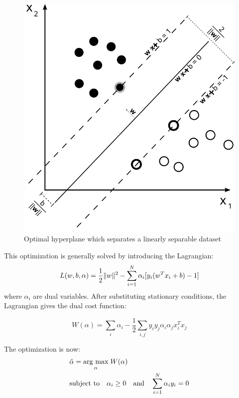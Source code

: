   \begin{figure}[!ht]
  \centering
    \includegraphics[scale=0.3]{./svm.png}
  \caption{Optimal hyperplane which separates a linearly separable dataset}
  \end{figure}

  \noindent This optimization is generally solved by introducing the Lagrangian:
  \begin{equation}
  L(w,b,\alpha) = \frac{1}{2} \lVert w \rVert^2 - \sum_{i = 1}^{N} \alpha_i [ y_i ( w^T x_i + b) - 1 ]
  \end{equation} 
  where $\alpha_i$ are dual variables. After substituting stationary conditions, the Lagrangian gives the dual cost function:
  
  \begin{equation}
  W(\alpha) = \sum_i \alpha_i - \frac{1}{2} \sum_{i,j} y_i y_j \alpha_i \alpha_j x_i^{T} x_j
  \end{equation}

  \noindent The optimization is now:
  \begin{eqnarray}
  & \hat{\alpha} = \underset{\alpha}{\operatorname{arg}\,\operatorname{max}}\; W(\alpha) \nonumber\\
  & \text{subject to} \quad \alpha_i \ge 0  \quad \text{and} \quad \sum_{i=1}^{N} \alpha_i y_i = 0
  \end{eqnarray}

